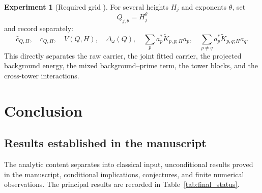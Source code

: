 \documentclass[11pt]{amsart}
\numberwithin{equation}{section}
\theoremstyle{plain}
\theoremstyle{definition}
\newtheorem{experiment}[theorem]{Experiment}
\theoremstyle{remark}
\newcommand{\1}{\mathbf{1}}
\begin{document}
\begin{experiment}[Required grid {\normalfont[Numerical]}]
\label{exp:required_height_cutoff_grid}
For several heights $H_j$ and exponents $\theta$, set
\begin{equation}
Q_{j,\theta}=H_j^\theta
\label{eq:numerical_Q_theta_grid}
\end{equation}
and record separately:
\begin{equation}
\widehat c_{Q,H},
\quad
c_{Q,H},
\quad
V(Q,H),
\quad
\Delta_\omega(Q),
\quad
\sum_p a_p^\ast\widetilde K_{p,p;H}a_p,
\quad
\sum_{p\neq q}a_p^\ast\widetilde K_{p,q;H}a_q.
\label{eq:numerical_required_grid_outputs}
\end{equation}
This directly separates the raw carrier, the joint fitted carrier, the
projected background energy, the mixed background--prime term, the tower
blocks, and the cross-tower interactions.
\end{experiment}



\section{Conclusion}
\label{sec:conclusion}

\subsection{Results established in the manuscript}
\label{subsec:conclusion_established}

The analytic content separates into classical input, unconditional results
proved in the manuscript, conditional implications, conjectures, and finite
numerical observations. The principal results are recorded in
Table~\ref{tab:final_status}.
\end{document}
